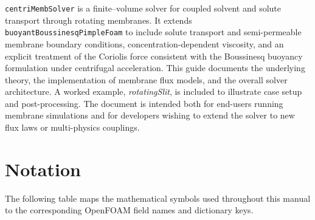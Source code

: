 \documentclass[11pt,a4paper]{article}
\begin{document}
	\noindent
	\texttt{centriMembSolver} is a finite–volume solver for coupled solvent and
	solute transport through rotating membranes. It extends
	\texttt{buoyantBoussinesqPimpleFoam} to include solute transport and semi-permeable membrane boundary conditions,
	concentration-dependent viscosity, and an explicit treatment of the
	Coriolis force consistent with the Boussinesq buoyancy formulation under
	centrifugal acceleration. This guide documents the underlying theory,
	the implementation of membrane flux models, and the overall solver
	architecture. A worked example, \emph{rotatingSlit}, is included to
	illustrate case setup and post-processing. The document is intended both
	for end-users running membrane simulations and for developers wishing to
	extend the solver to new flux laws or multi-physics couplings.
	
	\clearpage
	\thispagestyle{plain}
	\tableofcontents

	\clearpage
	\thispagestyle{plain}
	\section*{Notation}

	\noindent
	The following table maps the mathematical symbols used throughout this
	manual to the corresponding OpenFOAM field names and dictionary keys.
\end{document}

